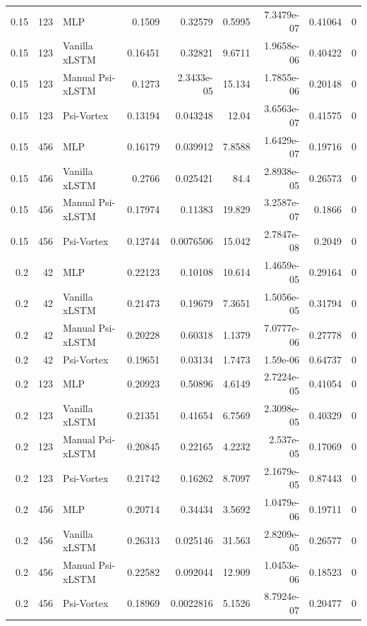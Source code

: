 \begin{tabular}{rrlrrrrrr}
0.15 & 123 & MLP & 0.1509 & 0.32579 & 0.5995 & 7.3479e-07 & 0.41064 & 0 \\
0.15 & 123 & Vanilla xLSTM & 0.16451 & 0.32821 & 9.6711 & 1.9658e-06 & 0.40422 & 0 \\
0.15 & 123 & Manual Psi-xLSTM & 0.1273 & 2.3433e-05 & 15.134 & 1.7855e-06 & 0.20148 & 0 \\
0.15 & 123 & Psi-Vortex & 0.13194 & 0.043248 & 12.04 & 3.6563e-07 & 0.41575 & 0 \\
0.15 & 456 & MLP & 0.16179 & 0.039912 & 7.8588 & 1.6429e-07 & 0.19716 & 0 \\
0.15 & 456 & Vanilla xLSTM & 0.2766 & 0.025421 & 84.4 & 2.8938e-05 & 0.26573 & 0 \\
0.15 & 456 & Manual Psi-xLSTM & 0.17974 & 0.11383 & 19.829 & 3.2587e-07 & 0.1866 & 0 \\
0.15 & 456 & Psi-Vortex & 0.12744 & 0.0076506 & 15.042 & 2.7847e-08 & 0.2049 & 0 \\
0.2 & 42 & MLP & 0.22123 & 0.10108 & 10.614 & 1.4659e-05 & 0.29164 & 0 \\
0.2 & 42 & Vanilla xLSTM & 0.21473 & 0.19679 & 7.3651 & 1.5056e-05 & 0.31794 & 0 \\
0.2 & 42 & Manual Psi-xLSTM & 0.20228 & 0.60318 & 1.1379 & 7.0777e-06 & 0.27778 & 0 \\
0.2 & 42 & Psi-Vortex & 0.19651 & 0.03134 & 1.7473 & 1.59e-06 & 0.64737 & 0 \\
0.2 & 123 & MLP & 0.20923 & 0.50896 & 4.6149 & 2.7224e-05 & 0.41054 & 0 \\
0.2 & 123 & Vanilla xLSTM & 0.21351 & 0.41654 & 6.7569 & 2.3098e-05 & 0.40329 & 0 \\
0.2 & 123 & Manual Psi-xLSTM & 0.20845 & 0.22165 & 4.2232 & 2.537e-05 & 0.17069 & 0 \\
0.2 & 123 & Psi-Vortex & 0.21742 & 0.16262 & 8.7097 & 2.1679e-05 & 0.87443 & 0 \\
0.2 & 456 & MLP & 0.20714 & 0.34434 & 3.5692 & 1.0479e-06 & 0.19711 & 0 \\
0.2 & 456 & Vanilla xLSTM & 0.26313 & 0.025146 & 31.563 & 2.8209e-05 & 0.26577 & 0 \\
0.2 & 456 & Manual Psi-xLSTM & 0.22582 & 0.092044 & 12.909 & 1.0453e-06 & 0.18523 & 0 \\
0.2 & 456 & Psi-Vortex & 0.18969 & 0.0022816 & 5.1526 & 8.7924e-07 & 0.20477 & 0 \\
\bottomrule
\end{tabular}
